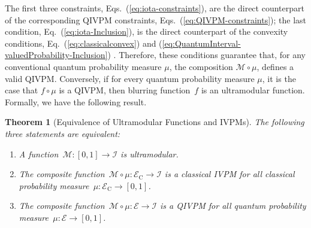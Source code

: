 \documentclass[english,reprint, aps, prl,superscriptaddress, showpacs,
showkeys, longbibliography, amsmath, amssymb, floatfix]{revtex4-1}
\theoremstyle{plain}
\newtheorem{thm}{Theorem}
\theoremstyle{definition}
\newcommand{\events}{\ensuremath{\mathcal{E}}}
\newcommand{\ultramodular}{\mathcal{M}}
\begin{document}
\noindent The first three constraints,
Eqs.~(\ref{eq:iota-constraints}), are the direct counterpart of the
corresponding QIVPM constraints, Eqs.~(\ref{eq:QIVPM-constraints});
the last condition, Eq.~(\ref{eq:iota-Inclusion}), is the direct
counterpart of the convexity conditions,
Eq.~(\ref{eq:classicalconvex}) and
(\ref{eq:QuantumInterval-valuedProbability-Inclusion})
\cite{Choquet1954,Shapley1971,NgMoYeh1997,MarinacciMontrucchio2005}. Therefore,
these conditions guarantee that, for any conventional quantum
probability measure $\mu$, the composition $\ultramodular \circ \mu$,
defines a valid QIVPM. Conversely, if for every quantum probability
measure $\mu$, it is the case that $f \circ \mu$ is a QIVPM, then blurring
function~$f$ is an ultramodular function. Formally, we have the following
result.

\begin{thm}[Equivalence of Ultramodular Functions and IVPMs]\label{thm:iota-statements}The
following three statements are equivalent:
\begin{enumerate}
\item \label{enu:iota-subject-to}A function~$\ultramodular:\left[0,1\right]\rightarrow\mathscr{I}$
is ultramodular.
\item \label{enu:iota-mu-CIVPM}The composite
  function~$\ultramodular\circ\mu:\events_{\mathrm{C}}\rightarrow\mathscr{I}$
  is a classical IVPM for all classical probability
  measure~$\mu:\events_{\mathrm{C}}\rightarrow\left[0,1\right]$.
\item \label{enu:iota-mu-QIVPM}The composite
  function~$\ultramodular\circ\mu:\events\rightarrow\mathscr{I}$ is a
  QIVPM for all quantum probability
  measure~$\mu:\events\rightarrow\left[0,1\right]$.
\end{enumerate}
\end{thm}
\end{document}
